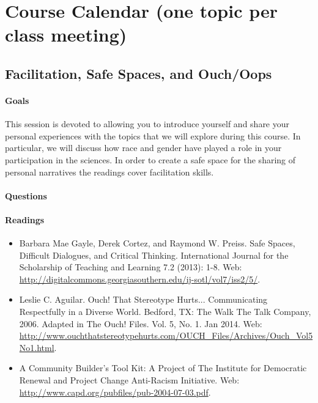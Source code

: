 \documentclass{article}
\begin{document}
\section{Course Calendar (one topic per class meeting)}

\subsection{Facilitation, Safe Spaces, and Ouch/Oops}
\paragraph{Goals} This session is devoted to allowing you to introduce yourself and share your personal experiences with the topics that we will explore during this course.  In particular, we will discuss how race and gender have played a role in your participation in the sciences.  In order to create a safe space for the sharing of personal narratives the readings cover facilitation skills.

\paragraph{Questions}

\paragraph{Readings}
\begin{itemize}
\item Barbara Mae Gayle, Derek Cortez, and Raymond W. Preiss. Safe Spaces, Difficult Dialogues, and Critical Thinking. International Journal for the Scholarship of Teaching and Learning 7.2 (2013): 1-8. Web: \url{http://digitalcommons.georgiasouthern.edu/ij-sotl/vol7/iss2/5/}.
\item Leslie C. Aguilar. Ouch! That Stereotype Hurts... Communicating Respectfully in a Diverse World. Bedford, TX: The Walk The Talk Company, 2006. Adapted in The Ouch! Files. Vol. 5, No. 1. Jan 2014. Web: \url{http://www.ouchthatstereotypehurts.com/OUCH_Files/Archives/Ouch_Vol5No1.html}.
\item A Community Builder's Tool Kit: A Project of The Institute for Democratic Renewal and Project Change Anti-Racism Initiative. Web: \url{http://www.capd.org/pubfiles/pub-2004-07-03.pdf}.
\end{itemize}
\end{document}
